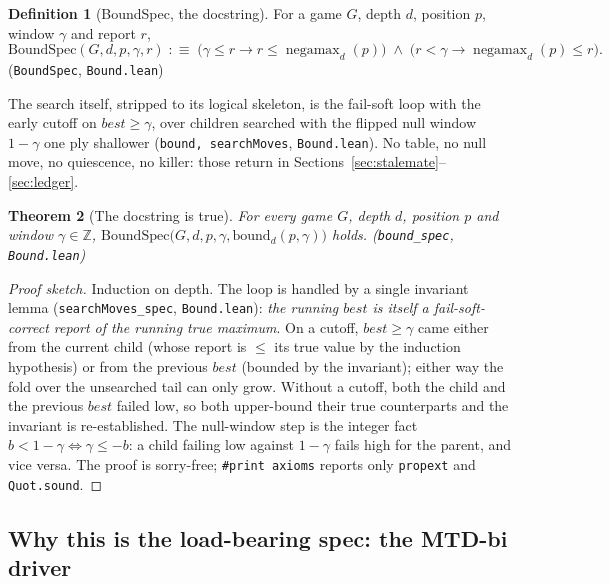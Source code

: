 \documentclass[11pt]{article}
\DeclareMathOperator{\negamax}{negamax}
\newcommand{\leanref}[2]{(\texttt{#1}, \texttt{#2})}%
\theoremstyle{plain}
\newtheorem{theorem}{Theorem}[section]
\theoremstyle{definition}
\newtheorem{definition}[theorem]{Definition}
\theoremstyle{remark}
\begin{document}
\begin{definition}[BoundSpec, the docstring]
\label{def:boundspec}
For a game $G$, depth $d$, position $p$, window $\gamma$ and report $r$,
\[
  \mathrm{BoundSpec}(G,d,p,\gamma,r) \;:\equiv\;
  \bigl(\gamma \le r \rightarrow r \le \negamax_d(p)\bigr)
  \;\wedge\;
  \bigl(r < \gamma \rightarrow \negamax_d(p) \le r\bigr).
\]
\leanref{BoundSpec}{Bound.lean}
\end{definition}

The search itself, stripped to its logical skeleton, is the fail-soft
loop with the early cutoff on $\mathit{best} \ge \gamma$, over children
searched with the flipped null window $1-\gamma$ one ply shallower
\leanref{bound, searchMoves}{Bound.lean}.  No table, no null move, no
quiescence, no killer: those return in
Sections~\ref{sec:stalemate}--\ref{sec:ledger}.

\begin{theorem}[The docstring is true]
\label{thm:bound-spec}
For every game $G$, depth $d$, position $p$ and window
$\gamma \in \mathbb{Z}$,
$\mathrm{BoundSpec}\bigl(G,d,p,\gamma,\mathrm{bound}_d(p,\gamma)\bigr)$
holds.
\leanref{bound\_spec}{Bound.lean}
\end{theorem}

\begin{proof}[Proof sketch]
Induction on depth.  The loop is handled by a single invariant lemma
\leanref{searchMoves\_spec}{Bound.lean}: \emph{the running
$\mathit{best}$ is itself a fail-soft-correct report of the running true
maximum}.  On a cutoff, $\mathit{best} \ge \gamma$ came either from the
current child (whose report is $\le$ its true value by the induction
hypothesis) or from the previous $\mathit{best}$ (bounded by the
invariant); either way the fold over the unsearched tail can only grow.
Without a cutoff, both the child and the previous $\mathit{best}$ failed
low, so both upper-bound their true counterparts and the invariant is
re-established.  The null-window step is the integer fact
$b < 1-\gamma \iff \gamma \le -b$: a child failing low against
$1-\gamma$ fails high for the parent, and vice versa.  The proof is
sorry-free; \texttt{\#print axioms} reports only \texttt{propext} and
\texttt{Quot.sound}.
\end{proof}

\subsection{Why this is the load-bearing spec: the MTD-bi driver}
\label{sec:mtdbi}
\end{document}
